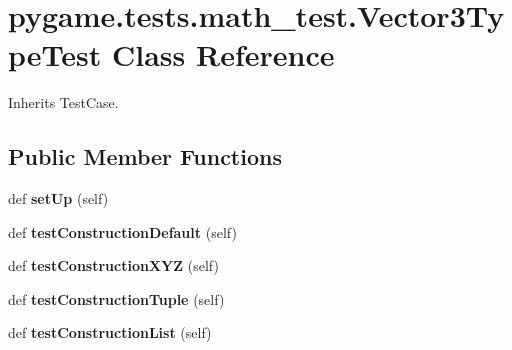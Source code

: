 \hypertarget{classpygame_1_1tests_1_1math__test_1_1_vector3_type_test}{}\section{pygame.\+tests.\+math\+\_\+test.\+Vector3\+Type\+Test Class Reference}
\label{classpygame_1_1tests_1_1math__test_1_1_vector3_type_test}


Inherits Test\+Case.

\subsection*{Public Member Functions}
\begin{DoxyCompactItemize}
\item 
\mbox{\label{classpygame_1_1tests_1_1math__test_1_1_vector3_type_test_af082d9156b4f573fe65fce60227b02ea}} 
def {\bfseries set\+Up} (self)
\item 
\mbox{\label{classpygame_1_1tests_1_1math__test_1_1_vector3_type_test_abd033260c35d877c1ae222ddee70c1c5}} 
def {\bfseries test\+Construction\+Default} (self)
\item 
\mbox{\label{classpygame_1_1tests_1_1math__test_1_1_vector3_type_test_ab2e41284ce321e9b9813df185ab478a1}} 
def {\bfseries test\+Construction\+X\+YZ} (self)
\item 
\mbox{\label{classpygame_1_1tests_1_1math__test_1_1_vector3_type_test_ae10c3d9e91a34eb1a5507b26a042d2d1}} 
def {\bfseries test\+Construction\+Tuple} (self)
\item 
\mbox{\label{classpygame_1_1tests_1_1math__test_1_1_vector3_type_test_a40d003c3b5464509075f95ca6fe562f4}} 
def {\bfseries test\+Construction\+List} (self)
\item 
\mbox{\label{classpygame_1_1tests_1_1math__test_1_1_vector3_type_test_ab604ec890ca93dfb01e1d01376a7d0db}} 

\end{DoxyCompactItemize}
